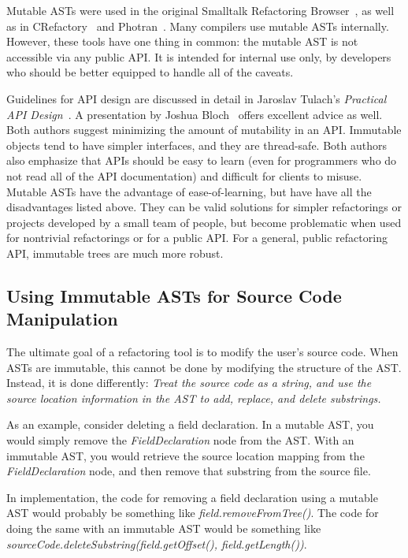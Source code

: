 \documentclass[prodmode]{acmlarge}
\begin{document}
Mutable ASTs were used in the original Smalltalk Refactoring
Browser~\cite{roberts97refactoring}, as well as in
CRefactory~\cite{garrido05program} and Photran~\cite{sle2008}.  Many compilers
use mutable ASTs internally.  However, these tools have one thing in common:
the mutable AST is not accessible via any public API.  It is intended for
internal use only, by developers who should be better equipped to handle all of
the caveats.

Guidelines for API design are discussed in detail in Jaroslav Tulach's
\textit{Practical API Design}~\cite{tulach08practical}.  A presentation by
Joshua Bloch~\cite{bloch} offers excellent advice as well.  Both authors
suggest minimizing the amount of mutability in an API.  Immutable objects tend
to have simpler interfaces, and they are thread-safe.  Both authors also
emphasize that APIs should be easy to learn (even for programmers who do not
read all of the API documentation) and difficult for clients to misuse. Mutable
ASTs have the advantage of ease-of-learning, but have have all the disadvantages
listed above. They can be valid solutions for simpler refactorings or projects
developed by a small team of people, but become problematic when used for 
nontrivial refactorings or for a public API. For a general, public refactoring
API, immutable trees are much more robust.

\subsection{Using Immutable ASTs for Source Code Manipulation}
\label{ss:manip}

The ultimate goal of a refactoring tool is to modify the user's source code.
When ASTs are immutable, this cannot be done by modifying the structure of the
AST.  Instead, it is done differently: \textit{Treat the source code as a
string, and use the source location information in the AST to add, replace, and
delete substrings.}

As an example, consider deleting a field declaration.  In a mutable AST, you
would simply remove the \textit{FieldDeclaration} node from the AST.  With an
immutable AST, you would retrieve the source location mapping from the
\textit{FieldDeclaration} node, and then remove that substring from the source
file.

In implementation, the code for removing a field declaration using a mutable
AST would probably be something like \textit{field.removeFromTree()}.  The code
for doing the same with an immutable AST would be something like
\textit{sourceCode.deleteSubstring(field.getOffset(), field.getLength())}.
\end{document}
